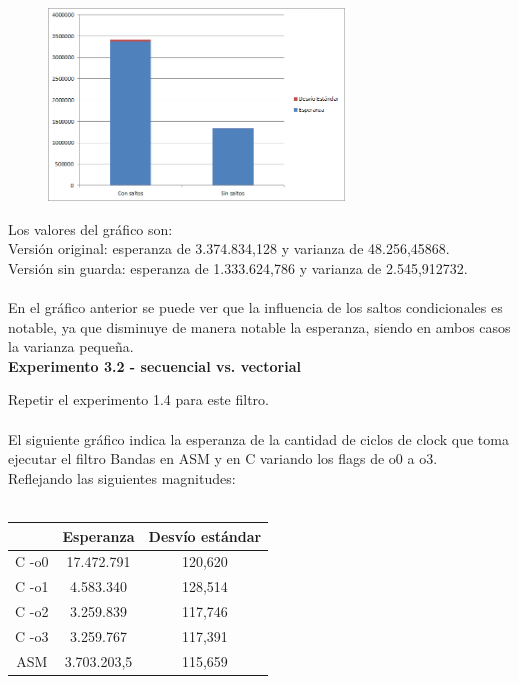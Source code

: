 \begin{figure}[h!]
  \begin{center}
	\includegraphics[width=0.7\textwidth]{imagenes/saltitos}
  \end{center}
\end{figure}

Los valores del gr\'afico son:\\

Versi\'on original: esperanza de 3.374.834,128	y varianza de 48.256,45868.\\

Versi\'on sin guarda: esperanza de 1.333.624,786 y varianza de 2.545,912732.\\
\\
	

En el gr\'afico anterior se puede ver que la influencia de los saltos condicionales es notable, ya que disminuye de manera notable la esperanza, siendo en ambos casos la varianza peque\~na. \\

\newpage
\vspace*{0.3cm} \noindent
\textbf{Experimento 3.2 - secuencial vs. vectorial}

Repetir el experimento 1.4 para este filtro. \\
\\
El siguiente gr\'afico indica la esperanza de la cantidad de ciclos de clock que toma ejecutar el filtro Bandas en ASM y en C variando los flags de o0 a o3. \\
Reflejando las siguientes magnitudes: \\
\\
 \begin{tabular}[c]{|c|c|c|}
	\hline
		 & Esperanza & Desv\'io est\'andar\\
		\hline
C -o0 & 17.472.791 & 120,620 \\
\hline
C -o1 & 4.583.340 & 128,514 \\
\hline
C -o2 & 3.259.839 & 117,746 \\
\hline
C -o3 & 3.259.767 & 117,391  \\
\hline
ASM & 3.703.203,5 & 115,659 \\
\hline
	\end{tabular}\\\\

